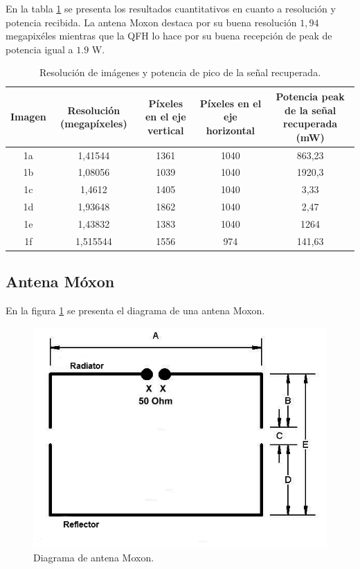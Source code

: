En la tabla \ref{tab:resolucion_senal} se presenta los resultados cuantitativos en cuanto a resolución y potencia recibida. La antena Moxon destaca por su buena resolución $1,94$ megapixéles mientras que la QFH lo hace por su buena recepción de peak de potencia igual a $1.9$ W.

\begin{table}[h]
    \centering
    \begin{tabular}{|c|c|c|c|c|}
        \hline
        \parbox[c][2cm][c]{2cm}{\centering Imagen} & \parbox[c][2cm][c]{2.5cm}{\centering Resolución (megapíxeles)} & \parbox[c][2cm][c]{2.5cm}{\centering Píxeles en el eje vertical} & \parbox[c][2cm][c]{2.5cm}{\centering Píxeles en el eje horizontal} & \parbox[c][2cm][c]{3cm}{\centering Potencia peak de la señal recuperada (mW)} \\
        \hline
        1a & 1,41544 & 1361 & 1040 & 863,23 \\
        \hline
        1b & 1,08056 & 1039 & 1040 & 1920,3 \\
        \hline
        1c & 1,4612  & 1405 & 1040 & 3,33 \\
        \hline
        1d & 1,93648 & 1862 & 1040 & 2,47 \\
        \hline
        1e & 1,43832 & 1383 & 1040 & 1264 \\
        \hline
        1f & 1,515544 & 1556 & 974 & 141,63 \\
        \hline
    \end{tabular}
    \caption{Resolución de imágenes y potencia de pico de la señal recuperada.}
    \label{tab:resolucion_senal}
\end{table}


\newpage


\subsection{Antena Móxon}
En la figura \ref{fig:antena_moxon} se presenta el diagrama de una antena Moxon. 

\begin{figure}
    \centering
    \includegraphics[width=0.55\linewidth]{img/moxon.png}
    \caption{Diagrama de antena Moxon.}
    \label{fig:antena_moxon}
\end{figure}

